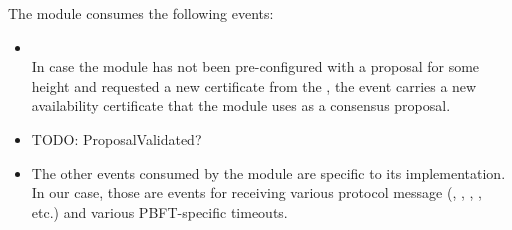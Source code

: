 \documentclass{article}
\begin{document}
The  module consumes the following events:
\begin{itemize}

    \item {}\\
    In case the  module has not been pre-configured with a proposal for some height
    and requested a new certificate from the ,
    the  event carries a new availability certificate
    that the  module uses as a consensus proposal.

    \item TODO: ProposalValidated?

    \item The other events consumed by the  module are specific to its implementation.
    In our case, those are events for receiving various protocol message
    (, , , , etc.) and various PBFT-specific timeouts.

\end{itemize}

\subsubsection{}
\subsubsection{}
\subsubsection{}
\subsubsection{}
\subsubsection{}
\subsubsection{}
\subsubsection{}
\end{document}

